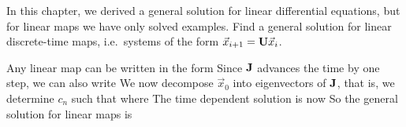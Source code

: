 In this chapter, we derived a general solution for linear differential equations, but for linear maps we have only solved examples. Find a general solution for linear discrete-time maps, 
i.e.~systems of the form $\vec{x}_{i+1}={\bf U}\vec{x}_i$.

\solution

Any linear map can be written in the form 
Since $\bf J$ advances the time by one step, we can also write 
We now decompose $\vec{x}_0$ into eigenvectors of $\bf J$, that is, we determine $c_n$ such that  
where 
The time dependent solution is now 
So the general solution for linear maps is 
